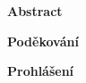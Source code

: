 \documentclass[
a4paper, %
11pt, %
onecolumn, %
openany, %
oldfontcommands,
]{memoir}
\begin{document}
\vspace{3cm}
\vfill


\noindent\Large\textbf{Abstract}\\ \normalsize




\newpage

\noindent\Large\textbf{Poděkování}\\ \normalsize


\vfill
\noindent\Large\textbf{Prohlášení}\\ \normalsize
\end{document}
